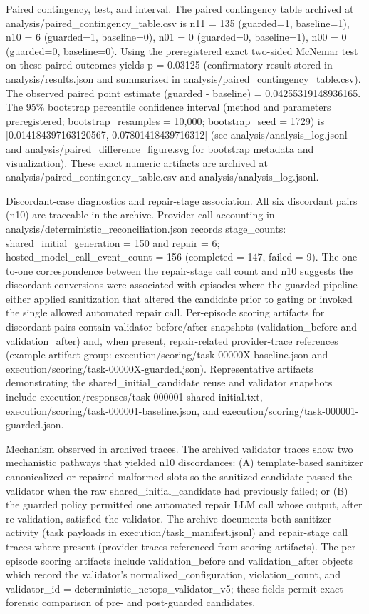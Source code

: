 \documentclass[conference]{IEEEtran}
\begin{document}
Paired contingency, test, and interval. The paired contingency table archived at analysis/paired\_contingency\_table.csv is
n11 = 135 (guarded=1, baseline=1),
n10 = 6   (guarded=1, baseline=0),
n01 = 0   (guarded=0, baseline=1),
n00 = 0   (guarded=0, baseline=0).
Using the preregistered exact two-sided McNemar test on these paired outcomes yields p = 0.03125 (confirmatory result stored in analysis/results.json and summarized in analysis/paired\_contingency\_table.csv). The observed paired point estimate (guarded - baseline) = 0.04255319148936165. The 95\% bootstrap percentile confidence interval (method and parameters preregistered; bootstrap\_resamples = 10,000; bootstrap\_seed = 1729) is [0.014184397163120567, 0.07801418439716312] (see analysis/analysis\_log.jsonl and analysis/paired\_difference\_figure.svg for bootstrap metadata and visualization). These exact numeric artifacts are archived at analysis/paired\_contingency\_table.csv and analysis/analysis\_log.jsonl.

Discordant-case diagnostics and repair-stage association. All six discordant pairs (n10) are traceable in the archive. Provider-call accounting in analysis/deterministic\_reconciliation.json records stage\_counts: shared\_initial\_generation = 150 and repair = 6; hosted\_model\_call\_event\_count = 156 (completed = 147, failed = 9). The one-to-one correspondence between the repair-stage call count and n10 suggests the discordant conversions were associated with episodes where the guarded pipeline either applied sanitization that altered the candidate prior to gating or invoked the single allowed automated repair call. Per-episode scoring artifacts for discordant pairs contain validator before/after snapshots (validation\_before and validation\_after) and, when present, repair-related provider-trace references (example artifact group: execution/scoring/task-00000X-baseline.json and execution/scoring/task-00000X-guarded.json). Representative artifacts demonstrating the shared\_initial\_candidate reuse and validator snapshots include execution/responses/task-000001-shared-initial.txt, execution/scoring/task-000001-baseline.json, and execution/scoring/task-000001-guarded.json.

Mechanism observed in archived traces. The archived validator traces show two mechanistic pathways that yielded n10 discordances: (A) template-based sanitizer canonicalized or repaired malformed slots so the sanitized candidate passed the validator when the raw shared\_initial\_candidate had previously failed; or (B) the guarded policy permitted one automated repair LLM call whose output, after re-validation, satisfied the validator. The archive documents both sanitizer activity (task payloads in execution/task\_manifest.jsonl) and repair-stage call traces where present (provider traces referenced from scoring artifacts). The per-episode scoring artifacts include validation\_before and validation\_after objects which record the validator's normalized\_configuration, violation\_count, and validator\_id = deterministic\_netops\_validator\_v5; these fields permit exact forensic comparison of pre- and post-guarded candidates.
\end{document}

